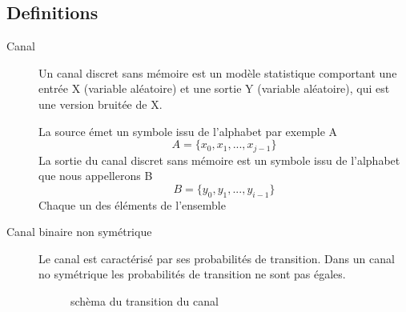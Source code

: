 \documentclass{report}
\begin{document}
\subsection{Definitions}
\label{definitions}
\begin{description}
\item[Canal]
Un canal discret sans mémoire est un modèle
statistique comportant une entrée X (variable aléatoire) et une sortie Y
(variable aléatoire), qui est une version bruitée de X.

La source émet un symbole issu de l'alphabet par exemple A
\begin{equation}\label{key}
A=\{x_0,x_1,...,x_{j-1}\}
\end{equation}
La sortie du canal discret sans mémoire est un symbole issu de l'alphabet
que nous appellerons B
\begin{equation}\label{key}
B=\{y_0,y_1,...,y_{i-1}\}
\end{equation}
Chaque un des éléments de l'ensemble
\item[Canal binaire non symétrique]
Le canal est caractérisé par ses probabilités de transition. Dans un canal no symétrique 
les probabilités de transition ne sont pas égales.


\begin{figure}[h]
	\centering
	\label{img:schema_transition}
	\caption{schèma du transition du canal}
\end{figure}


\end{description}
\end{document}
